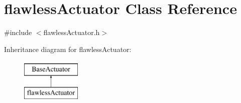 \hypertarget{classflawless_actuator}{}\section{flawless\+Actuator Class Reference}
\label{classflawless_actuator}


{\ttfamily \#include $<$flawless\+Actuator.\+h$>$}

Inheritance diagram for flawless\+Actuator\+:\begin{figure}[H]
\begin{center}
\leavevmode
\includegraphics[height=2.000000cm]{classflawless_actuator}
\end{center}
\end{figure}
